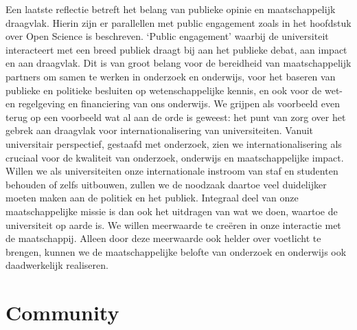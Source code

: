 \documentclass{jote-book}
\begin{document}
	Een laatste reflectie betreft het belang van publieke opinie en maatschappelijk draagvlak. Hierin zijn er parallellen met public engagement zoals in het hoofdstuk over Open Science is beschreven. ‘Public engagement' waarbij de universiteit interacteert met een breed publiek draagt bij aan het publieke debat, aan impact en aan draagvlak. Dit is van groot belang voor de bereidheid van maatschappelijk partners om samen te werken in onderzoek en onderwijs, voor het baseren van publieke en politieke besluiten op wetenschappelijke kennis, en ook voor de wet- en regelgeving en financiering van ons onderwijs. We grijpen als voorbeeld even terug op een voorbeeld wat al aan de orde is geweest: het punt van zorg over het gebrek aan draagvlak voor internationalisering van universiteiten. Vanuit universitair perspectief, gestaafd met onderzoek, zien we internationalisering als cruciaal voor de kwaliteit van onderzoek, onderwijs en maatschappelijke impact. Willen we als universiteiten onze internationale instroom van staf en studenten behouden of zelfs uitbouwen, zullen we de noodzaak daartoe veel duidelijker moeten maken aan de politiek en het publiek. Integraal deel van onze maatschappelijke missie is dan ook het uitdragen van wat we doen, waartoe de universiteit op aarde is. We willen meerwaarde te creëren in onze interactie met de maatschappij. Alleen door deze meerwaarde ook helder over voetlicht te brengen, kunnen we de maatschappelijke belofte van onderzoek en onderwijs ook daadwerkelijk realiseren.







	\chapter{Community}



	\section{}



	\section{}



	\section{}
\end{document}
